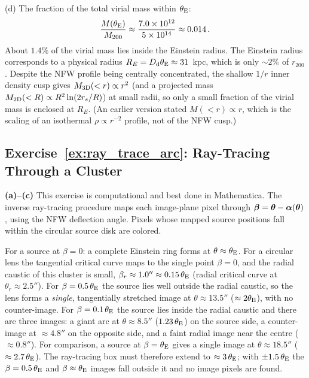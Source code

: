 (d) The fraction of the total virial mass within $\theta_{\mathrm{E}}$:
\begin{equation*}
    \frac{M(\theta_{\mathrm{E}})}{M_{200}}
    \approx \frac{7.0\times 10^{12}}{5\times 10^{14}} \approx 0.014 \,.
\end{equation*}
About $1.4\%$ of the virial mass lies inside the Einstein radius.
The Einstein radius corresponds to a physical radius
$R_E = D_{\mathrm{d}} \theta_{\mathrm{E}} \approx 31$~kpc, which is only $\sim 2\%$ of
$r_{200}$.  Despite the NFW profile being centrally concentrated, the
shallow $1/r$ inner density cusp gives $M_{\rm 3D}(<r) \propto r^2$ (and a
projected mass $M_{\rm 2D}(<R) \propto R^2\ln(2r_s/R)$) at small radii, so
only a small fraction of the virial mass is enclosed at $R_E$.  (An earlier
version stated $M(<r) \propto r$, which is the scaling of an isothermal
$\rho \propto r^{-2}$ profile, not of the NFW cusp.)
\checkmark


\subsection*{Exercise~\ref{ex:ray_trace_arc}: Ray-Tracing Through a Cluster}

\textbf{(a)--(c)} This exercise is computational and best done in
Mathematica.  The inverse ray-tracing procedure maps each image-plane
pixel through $\boldsymbol{\beta} = \boldsymbol{\theta} - \boldsymbol{\alpha}(\boldsymbol{\theta})$, using
the NFW deflection angle.  Pixels whose mapped source positions fall
within the circular source disk are colored.

For a source at $\beta = 0$: a complete Einstein ring forms
at $\theta \approx \theta_{\mathrm{E}}$.  For a circular lens the tangential critical
curve maps to the single point $\beta = 0$, and the radial caustic of this
cluster is small, $\beta_r \approx 1.0'' \approx 0.15\,\theta_{\mathrm{E}}$ (radial
critical curve at $\theta_r \approx 2.5''$).  For $\beta = 0.5\,\theta_{\mathrm{E}}$
the source lies well outside the radial caustic, so the lens forms a
\emph{single}, tangentially stretched image at $\theta \approx 13.5''$
($\approx 2\theta_{\mathrm{E}}$), with no counter-image.  For $\beta = 0.1\,\theta_{\mathrm{E}}$
the source lies inside the radial caustic and there are three images: a
giant arc at $\theta \approx 8.5''$ ($1.23\,\theta_{\mathrm{E}}$) on the source
side, a counter-image at $\approx 4.8''$ on the opposite side, and a
faint radial image near the centre ($\approx 0.8''$).  For comparison, a
source at $\beta = \theta_{\mathrm{E}}$ gives a single image at $\theta \approx 18.5''$
($\approx 2.7\,\theta_{\mathrm{E}}$).  The ray-tracing box must therefore extend to
$\approx 3\,\theta_{\mathrm{E}}$; with $\pm1.5\,\theta_{\mathrm{E}}$ the $\beta = 0.5\,\theta_{\mathrm{E}}$ and
$\beta \approx \theta_{\mathrm{E}}$ images fall outside it and no image pixels are found.

